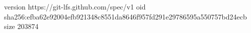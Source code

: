 version https://git-lfs.github.com/spec/v1
oid sha256:efba62e92004efb921348c8551da8646f957fd291e29786595a550757bd24ecb
size 203874

